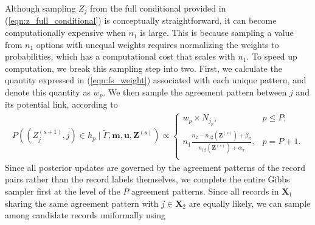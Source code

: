\documentclass[ba]{imsart}
\begin{document}
Although sampling \(Z_j\) from the full conditional provided in (\ref{eqn:z_full_conditional}) is conceptually straightforward, it can become computationally expensive when $n_1$ is large. This is because sampling a value from $n_1$ options with unequal weights requires normalizing the weights to probabilities, which has a computational cost that scales with $n_1$. To speed up computation, we break this sampling step into two. First, we calculate the quantity expressed in (\ref{eqn:fs_weight}) associated with each unique pattern, and denote this quantity as $w_{p}$. We then sample the agreement pattern between \(j\) and its potential link, according to
\begin{align}
	\label{eqn:gibbs1}
	P\left(\left(Z_j^{(s+1)}, j\right) \in h_p \mid \tilde{\Gamma}, \bm{m}, \bm{u}, \bm{Z^{(s)}}\right) \propto
	\begin{cases} 
		w_{p}\times N_{j_p},  & p \leq P; \\
		n_1 \frac{n_2 - n_{12}(\bm{Z}^{(s)}) + \beta_{\pi}}{n_{12}(\bm{Z}^{(s)}) + \alpha_{\pi}}, &   p = P + 1. \\
	\end{cases}
\end{align}
Since all posterior updates are governed by the agreement patterns of the record pairs rather than the record labels themselves, we complete the entire Gibbs sampler first at the level of the \(P\) agreement patterns. Since all records in $\bm{X}_1$ sharing the same agreement pattern with $j \in \bm{X}_2$ are equally likely, we can sample among candidate records uniformally using
\end{document}
